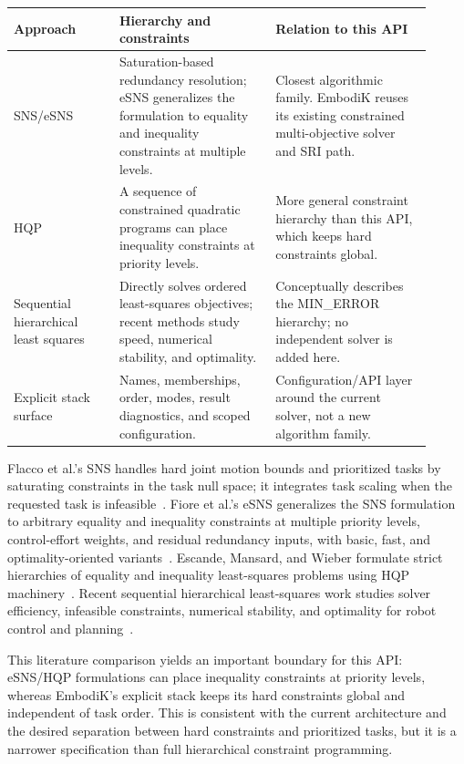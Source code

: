 \documentclass[11pt]{article}
\begin{document}
\begin{center}
\small
\begin{tabular}{>{\raggedright\arraybackslash}p{0.23\linewidth}
                >{\raggedright\arraybackslash}p{0.34\linewidth}
                >{\raggedright\arraybackslash}p{0.34\linewidth}}
\toprule
\textbf{Approach} & \textbf{Hierarchy and constraints} &
\textbf{Relation to this API} \\
\midrule
SNS/eSNS & Saturation-based redundancy resolution; eSNS generalizes the
formulation to equality and inequality constraints at multiple levels. &
Closest algorithmic family. EmbodiK reuses its existing constrained
multi-objective solver and SRI path. \\
HQP & A sequence of constrained quadratic programs can place inequality
constraints at priority levels. & More general constraint hierarchy than
this API, which keeps hard constraints global. \\
Sequential hierarchical least squares & Directly solves ordered least-squares
objectives; recent methods study speed, numerical stability, and optimality. &
Conceptually describes the MIN\_ERROR hierarchy; no independent solver is
added here. \\
Explicit stack surface & Names, memberships, order, modes, result diagnostics,
and scoped configuration. & Configuration/API layer around the current
solver, not a new algorithm family. \\
\bottomrule
\end{tabular}
\end{center}

Flacco et al.'s SNS handles hard joint motion bounds and prioritized tasks by
saturating constraints in the task null space; it integrates task scaling
when the requested task is infeasible~\cite{flacco2015}. Fiore et al.'s eSNS
generalizes the SNS formulation to arbitrary equality and inequality
constraints at multiple priority levels, control-effort weights, and residual
redundancy inputs, with basic, fast, and optimality-oriented
variants~\cite{fiore2022}. Escande, Mansard, and Wieber formulate strict
hierarchies of equality and inequality least-squares problems using HQP
machinery~\cite{escande2014}. Recent sequential hierarchical least-squares
work studies solver efficiency, infeasible constraints, numerical stability,
and optimality for robot control and planning~\cite{chefchaouni2024}.

This literature comparison yields an important boundary for this API:
eSNS/HQP formulations can place inequality constraints at priority levels,
whereas EmbodiK's explicit stack keeps its hard constraints global and
independent of task order. This is consistent with the current architecture
and the desired separation between hard constraints and prioritized tasks,
but it is a narrower specification than full hierarchical constraint
programming.
\end{document}
